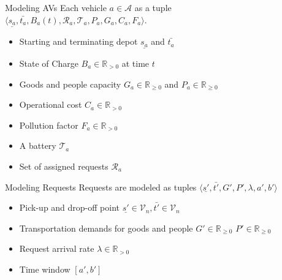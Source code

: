 
\begin{frame}{Modeling AVs}
	Each vehicle $a \in\mathcal{A}$ as a tuple $\langle \underline{s_a},\bar{t_a}, B_a(t),\mathcal{R}_a, \mathcal{T}_a, P_a, G_a, C_a, F_a  \rangle$.
	\begin{itemize}
		\item Starting and terminating depot $\underline{s_a}$ and $\bar{t_a}$ 
		\item  State of Charge $B_a \in \mathbb{R}_{>0}$ at time $t$
		\item  Goods and people capacity $G_a \in \mathbb{R}_{\ge0}$ and $P_a \in \mathbb{R}_{\ge0}$ 
		\item  Operational cost $C_a \in \mathbb{R}_{>0}$ 
		\item  Pollution factor $F_a \in \mathbb{R}_{>0}$
		\item A battery $\mathcal{T}_a$
		\item Set of assigned requests $\mathcal{R}_a$ 
	\end{itemize}
\end{frame}


\begin{frame}{Modeling Requests}
	Requests are modeled as tuples $\langle \underline{s'},\bar{t'}, G', P',\lambda, a', b'\rangle$
	\begin{itemize}
		\item  Pick-up and drop-off point $\underline{s'} \in \mathcal{V}_n,\bar{t'} \in \mathcal{V}_n$ 
		\item  Transportation demands for goods and people $G'\in \mathbb{R}_{\ge0}$ $P'\in \mathbb{R}_{\ge0}$ 
		\item  Request arrival rate $\lambda \in \mathbb{R}_{>0}$ 
		\item  Time window $[a',b']$ 
	\end{itemize}
\end{frame}

